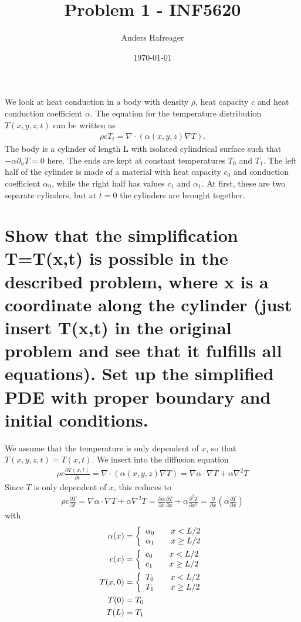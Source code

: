 \documentclass[a4paper,10pt]{article}
\title{Problem 1 - INF5620}
\date{\today}
\author{Anders Hafreager}
\renewcommand{\(}{\left(}
\renewcommand{\)}{\right)}
\newcommand{\dpart}[2]{\frac{\partial#1}{\partial#2}}
\newcommand{\dpartt}[2]{\frac{\partial^2#1}{\partial#2^2}}
\begin{document}
We look at heat conduction in a body with density $\rho$, heat capacity $c$ and heat conduction coefficient $\alpha$. The equation for the temperature distribution $T(x,y,z,t)$ can be written as
\begin{align*}
  \rho c T_t = \nabla \cdot (\alpha(x,y,z)\nabla T).
\end{align*}
The body is a cylinder of length L with isolated cylindrical surface such that $-\alpha\partial_n T=0$ here. The ends are kept at constant temperatures $T_0$ and $T_1$. The left half of the cylinder is made of a material with heat capacity $c_0$ and conduction coefficient $\alpha_0$, while the right half has values $c_1$ and $\alpha_1$. At first, these are two separate cylinders, but at $t=0$ the cylinders are brought together.

\section{Show that the simplification T=T(x,t) is possible in the described problem, where x is a coordinate along the cylinder (just insert T(x,t) in the original problem and see that it fulfills all equations). Set up the simplified PDE with proper boundary and initial conditions.}
We assume that the temperature is only dependent of $x$, so that $T(x,y,z,t) = T(x,t)$. We insert into the diffusion equation
\begin{align*}
  \rho c \dpart{T(x,t)}{t} = \nabla \cdot (\alpha(x,y,z)\nabla T) = \nabla\alpha\cdot\nabla T + \alpha \nabla^2 T
\end{align*}
Since $T$ is only dependent of $x$, this reduces to
\begin{align*}
  \rho c \dpart{T}{t} = \nabla\alpha\cdot\nabla T + \alpha \nabla^2 T = \dpart{\alpha}{x}\dpart{T}{x} + \alpha\dpartt{T}{x} = \dpart{}{x}\left(\alpha\dpart{T}{x}\right)
\end{align*}
with 
\begin{align*}
  \alpha(x) &= \left\{ 
  \begin{array}{l l}
    \alpha_0 & \quad x<L/2\\
    \alpha_1 & \quad x\geq L/2
  \end{array} \right.\\
  c(x) &= \left\{ 
  \begin{array}{l l}
    c_0 & \quad x<L/2\\
    c_1 & \quad x\geq L/2
  \end{array} \right.\\
  T(x,0) &= \left\{ 
  \begin{array}{l l}
    T_0 & \quad x<L/2\\
    T_1 & \quad x\geq L/2
  \end{array} \right.\\
  T(0) &= T_0\\
  T(L) &= T_1
\end{align*}
\end{document}

